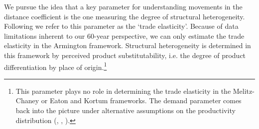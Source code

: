 \documentclass[12pt,twoside,a4paper,notitlepage]{article}
\begin{document}
We pursue the idea that a key parameter for understanding movements in the distance coefficient is the one measuring the degree of structural heterogeneity.
Following \cite{Arkolakis2012} we refer to this parameter as the `trade elasticity'.
Because of data limitations inherent to our 60-year perspective, we can only estimate the trade elasticity in the Armington framework.
Structural heterogeneity is determined in this framework by perceived product substitutability, i.e.
the degree of product differentiation by place of origin.\footnote{This parameter plays no role in determining the trade elasticity in the Melitz-Chaney or Eaton and Kortum frameworks. The demand parameter comes back into the picture under alternative assumptions on the productivity distribution  (\cite{Melitz2015}, \cite{Bas2017}, \cite{Feenstra2018a}).}
\end{document}
